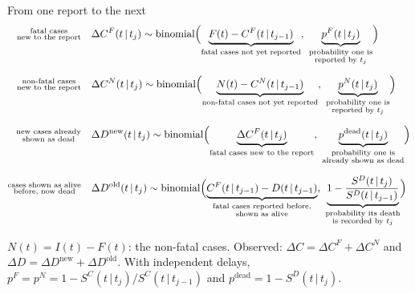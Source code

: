 \documentclass[aspectratio=169,9pt]{beamer}
\newcommand{\given}{\,|\,}
\newcommand{\bin}{\operatorname{binomial}}
\newcommand{\dnew}{\Delta D^{\mathrm{new}}}
\newcommand{\dold}{\Delta D^{\mathrm{old}}}
\begin{document}
\begin{frame}{From one report to the next}
\small
\begin{align*}
\substack{\text{fatal cases}\\\text{new to the report}}\quad
 & \Delta C^{F}(t\given t_j)\sim\bin\Bigl(\underbrace{F(t)-C^{F}(t\given t_{j-1})}_{\text{fatal cases not yet reported}},\
 \underbrace{p^{F}(t\given t_j)}_{\substack{\text{probability one is}\\\text{reported by }t_j}}\Bigr)\\[6pt]
\substack{\text{non-fatal cases}\\\text{new to the report}}\quad
 & \Delta C^{N}(t\given t_j)\sim\bin\Bigl(\underbrace{N(t)-C^{N}(t\given t_{j-1})}_{\text{non-fatal cases not yet reported}},\
 \underbrace{p^{N}(t\given t_j)}_{\substack{\text{probability one is}\\\text{reported by }t_j}}\Bigr)\\[6pt]
\substack{\text{new cases already}\\\text{shown as dead}}\quad
 & \dnew(t\given t_j)\sim\bin\Bigl(\underbrace{\Delta C^{F}(t\given t_j)}_{\text{fatal cases new to the report}},\
 \underbrace{p^{\text{dead}}(t\given t_j)}_{\substack{\text{probability one is}\\\text{already shown as dead}}}\Bigr)\\[6pt]
\substack{\text{cases shown as alive}\\\text{before, now dead}}\quad
 & \dold(t\given t_j)\sim\bin\Bigl(\underbrace{C^{F}(t\given t_{j-1})-D(t\given t_{j-1})}_{\substack{\text{fatal cases reported before,}\\\text{shown as alive}}},\
 \underbrace{1-\frac{S^{D}(t\given t_j)}{S^{D}(t\given t_{j-1})}}_{\substack{\text{probability its death}\\\text{is recorded by }t_j}}\Bigr)
\end{align*}

\footnotesize
$N(t)=I(t)-F(t)$: the non-fatal cases. Observed: $\Delta C=\Delta C^{F}+\Delta
C^{N}$ and $\Delta D=\dnew+\dold$. With independent delays,
$p^{F}=p^{N}=1-S^{C}(t\given t_j)/S^{C}(t\given t_{j-1})$ and
$p^{\text{dead}}=1-S^{D}(t\given t_j)$.
\end{frame}
\end{document}
